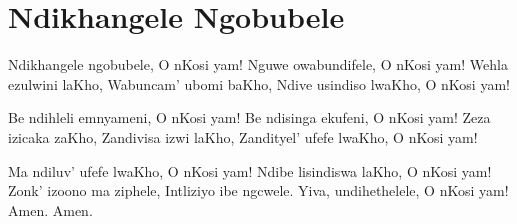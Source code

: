 \starttocol
\chapter{Ndikhangele Ngobubele}
\nexttocol
\hfill{\it }
\stoptocol
\starttocol
\startlines
{\sc Ndikhangele} ngobubele,
O nKosi yam!
Nguwe owabundifele,
O nKosi yam!
Wehla ezulwini laKho,
Wabuncam' ubomi baKho,
Ndive usindiso lwaKho,
O nKosi yam!

Be ndihleli emnyameni,
O nKosi yam!
Be ndisinga ekufeni,
O nKosi yam!
Zeza izicaka zaKho,
Zandivisa izwi laKho,
Zandityel' ufefe lwaKho,
O nKosi yam!

Ma ndiluv' ufefe lwaKho,
O nKosi yam!
Ndibe lisindiswa laKho,
O nKosi yam!
Zonk' izoono ma ziphele,
Intliziyo ibe ngcwele.
Yiva, undihethelele,
O nKosi yam! Amen.
          \hfill Amen.~~~~~~~~~
\stoplines
\nexttocol

\stoptocol
